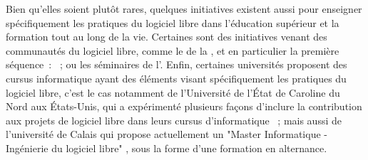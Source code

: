Bien qu'elles soient plutôt rares, quelques initiatives existent aussi pour enseigner spécifiquement les
pratiques du logiciel libre dans l'éducation supérieur et la formation tout au long de la vie. Certaines sont
des initiatives venant des communautés du logiciel libre, comme le %
de la , et en particulier la première séquence : %
 ; ou les
séminaires de l'.
Enfin, certaines universités proposent des cursus informatique ayant des éléments visant spécifiquement les
pratiques du logiciel libre, c'est le cas notamment de l'Université de l'État de Caroline du Nord aux
États-Unis, qui a expérimenté plusieurs façons d'inclure la contribution aux projets de logiciel libre dans
leurs cursus d'informatique  ; mais aussi de l'université de Calais
qui propose actuellement un "Master Informatique - Ingénierie du logiciel libre"%
,
sous la forme d'une formation en alternance.
